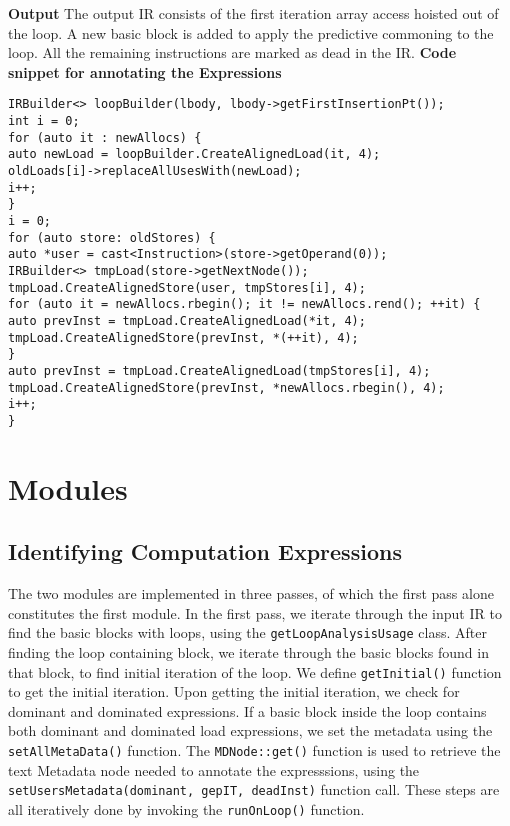\noindent
\textbf{Output}\newline
The output IR consists of the first iteration array access hoisted out of the loop. A new basic block is added to apply the predictive commoning to the loop. All the remaining instructions are marked as dead in the IR.\newline
\textbf{Code snippet for annotating the Expressions}
\begin{lstlisting}
IRBuilder<> loopBuilder(lbody, lbody->getFirstInsertionPt());
int i = 0;
for (auto it : newAllocs) {
auto newLoad = loopBuilder.CreateAlignedLoad(it, 4);
oldLoads[i]->replaceAllUsesWith(newLoad);
i++;
}
i = 0;
for (auto store: oldStores) {
auto *user = cast<Instruction>(store->getOperand(0));
IRBuilder<> tmpLoad(store->getNextNode());
tmpLoad.CreateAlignedStore(user, tmpStores[i], 4);
for (auto it = newAllocs.rbegin(); it != newAllocs.rend(); ++it) {
auto prevInst = tmpLoad.CreateAlignedLoad(*it, 4);
tmpLoad.CreateAlignedStore(prevInst, *(++it), 4);
}
auto prevInst = tmpLoad.CreateAlignedLoad(tmpStores[i], 4);
tmpLoad.CreateAlignedStore(prevInst, *newAllocs.rbegin(), 4);
i++;
}

\end{lstlisting}

\section{Modules}
\subsection{Identifying Computation Expressions}
The two modules are implemented in three passes, of which the first pass alone constitutes the first module. In the first pass, we iterate through the input IR to find the basic blocks with loops, using the \texttt	{getLoopAnalysisUsage} class. After finding the loop containing block, we iterate through the basic blocks found in that block, to find initial iteration of the loop. We define \texttt{getInitial()} function to get the initial iteration. Upon getting the initial iteration, we check for dominant and dominated expressions. If a basic block inside the loop contains both dominant and dominated load expressions, we set the metadata using the 
\texttt{setAllMetaData()} function. The \texttt{MDNode::get()} function is used to retrieve the text Metadata node needed to annotate the expresssions, using the \texttt{ setUsersMetadata(dominant, gepIT, deadInst)} function call. These steps are all iteratively done by invoking the \texttt{runOnLoop()} function. 


